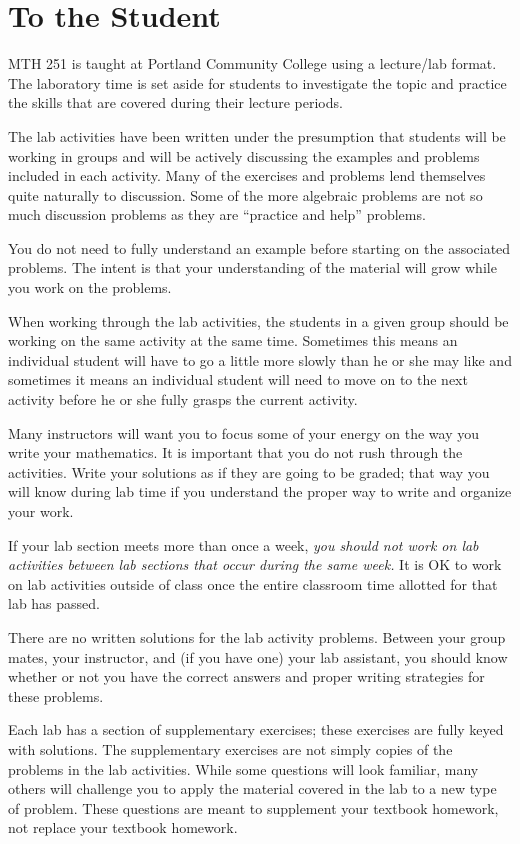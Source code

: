 \documentclass[10pt,oneside,]{book}
\theoremstyle{plain}
\theoremstyle{definition}
\numberwithin{equation}{section}
\begin{document}
\chapter*{To the Student}\label{to-the-student}
MTH 251 is taught at Portland Community College using a lecture/lab format. The laboratory time is set aside for students to investigate the topic and practice the skills that are covered during their lecture periods.%
\par
The lab activities have been written under the presumption that students will be working in groups and will be actively discussing the examples and problems included in each activity. Many of the exercises and problems lend themselves quite naturally to discussion. Some of the more algebraic problems are not so much discussion problems as they are ``practice and help'' problems.%
\par
You do not need to fully understand an example before starting on the associated problems. The intent is that your understanding of the material will grow while you work on the problems.%
\par
When working through the lab activities, the students in a given group should be working on the same activity at the same time. Sometimes this means an individual student will have to go a little more slowly than he or she may like and sometimes it means an individual student will need to move on to the next activity before he or she fully grasps the current activity.%
\par
Many instructors will want you to focus some of your energy on the way you write your mathematics. It is important that you do not rush through the activities. Write your solutions as if they are going to be graded; that way you will know during lab time if you understand the proper way to write and organize your work.%
\par
If your lab section meets more than once a week, \emph{you should not work on lab activities between lab sections that occur during the same week.} It is OK to work on lab activities outside of class once the entire classroom time allotted for that lab has passed.%
\par
There are no written solutions for the lab activity problems. Between your group mates, your instructor, and (if you have one) your lab assistant, you should know whether or not you have the correct answers and proper writing strategies for these problems.%
\par
Each lab has a section of supplementary exercises; these exercises are fully keyed with solutions. The supplementary exercises are not simply copies of the problems in the lab activities. While some questions will look familiar, many others will challenge you to apply the material covered in the lab to a new type of problem. These questions are meant to supplement your textbook homework, not replace your textbook homework.%
\end{document}
